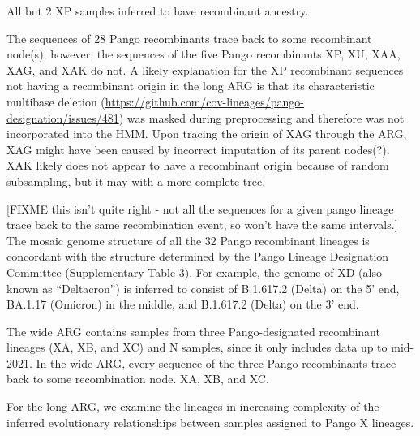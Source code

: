 \documentclass{article}
\begin{document}

All but 2 XP samples inferred to have recombinant ancestry.

The sequences of 28 Pango recombinants trace back
to some recombinant node(s); however, the sequences of the five Pango
recombinants XP, XU, XAA, XAG, and XAK do not.
A likely explanation for the XP
recombinant sequences not having a recombinant origin in the long ARG is that
its characteristic multibase deletion
(\url{https://github.com/cov-lineages/pango-designation/issues/481}) was masked
during preprocessing and therefore was not incorporated into the HMM.
Upon tracing the origin of XAG through the ARG, XAG might have been caused by
incorrect imputation of its parent nodes(?). XAK likely does not appear to have
a recombinant origin because of random subsampling, but it may with a more
complete tree.

[FIXME this isn't quite right - not all the sequences for a given pango
lineage trace back to the same recombination event, so won't have the same
intervals.]
The mosaic genome structure of all the 32 Pango recombinant lineages is concordant with
the structure determined by the Pango Lineage Designation Committee
(Supplementary Table 3). For example, the genome of XD (also known as
``Deltacron'') is inferred to consist of B.1.617.2 (Delta) on the 5’ end, BA.1.17
(Omicron) in the middle, and B.1.617.2 (Delta) on the 3’ end.

The wide ARG contains samples from three Pango-designated recombinant
lineages (XA, XB, and XC) and N samples, since it only includes data
up to mid-2021.
In the wide ARG, every sequence of the three Pango recombinants trace back to
some recombination node. XA, XB, and XC.

For the long ARG, we examine the lineages in increasing complexity of the
inferred evolutionary relationships between samples assigned to Pango
X lineages.

\end{document}
